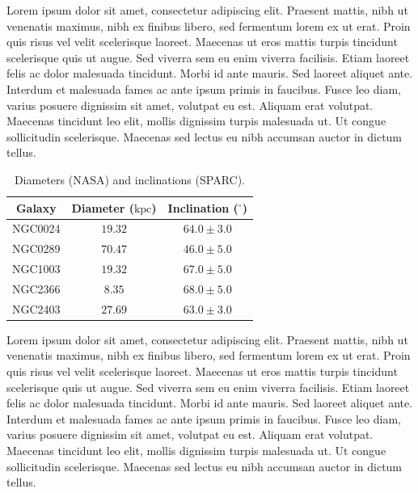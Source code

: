\documentclass{article}
\newcommand\kpc{\textrm{kpc}}
\begin{document}
Lorem ipsum dolor sit amet, consectetur adipiscing elit. Praesent mattis, nibh ut venenatis maximus, nibh ex finibus libero, sed fermentum lorem ex ut erat. Proin quis risus vel velit scelerisque laoreet. Maecenas ut eros mattis turpis tincidunt scelerisque quis ut augue. Sed viverra sem eu enim viverra facilisis. Etiam laoreet felis ac dolor malesuada tincidunt. Morbi id ante mauris. Sed laoreet aliquet ante. Interdum et malesuada fames ac ante ipsum primis in faucibus. Fusce leo diam, varius posuere dignissim sit amet, volutpat eu est. Aliquam erat volutpat. Maecenas tincidunt leo elit, mollis dignissim turpis malesuada ut. Ut congue sollicitudin scelerisque. Maecenas sed lectus eu nibh accumsan auctor in dictum tellus.


\singlespacing %
\begin{table}[h!]
    \centering
    \begin{tabular}{|c|c|c|}
        \hline
        Galaxy & Diameter ($\kpc$) & Inclination ($^\circ$) \\
        \hline
        NGC0024 & $19.32$ & $64.0 \pm 3.0$ \\
        NGC0289 & $70.47$ & $46.0 \pm 5.0$ \\
        NGC1003 & $19.32$ & $67.0 \pm 5.0$ \\
        NGC2366 & $8.35$ & $68.0 \pm 5.0$ \\
        NGC2403 & $27.69$ & $63.0 \pm 3.0$ \\ 
        \hline
    \end{tabular}
    \caption{Diameters (NASA) and inclinations (SPARC).}
    \label{tab:diameters-inclinations}
\end{table}
\doublespacing

Lorem ipsum dolor sit amet, consectetur adipiscing elit. Praesent mattis, nibh ut venenatis maximus, nibh ex finibus libero, sed fermentum lorem ex ut erat. Proin quis risus vel velit scelerisque laoreet. Maecenas ut eros mattis turpis tincidunt scelerisque quis ut augue. Sed viverra sem eu enim viverra facilisis. Etiam laoreet felis ac dolor malesuada tincidunt. Morbi id ante mauris. Sed laoreet aliquet ante. Interdum et malesuada fames ac ante ipsum primis in faucibus. Fusce leo diam, varius posuere dignissim sit amet, volutpat eu est. Aliquam erat volutpat. Maecenas tincidunt leo elit, mollis dignissim turpis malesuada ut. Ut congue sollicitudin scelerisque. Maecenas sed lectus eu nibh accumsan auctor in dictum tellus.
\end{document}
